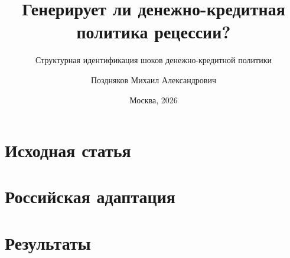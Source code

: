\documentclass[aspectratio=169]{beamer}
\title[ДКП и рецессии]{Генерирует ли денежно-кредитная политика рецессии?}
\subtitle{Структурная идентификация шоков денежно-кредитной политики}
\author[Поздняков М. А.]{Поздняков Михаил Александрович}
\institute{Факультет экономических наук\\НИУ ВШЭ}
\date{Москва, 2026}
\begin{document}


\section{Исходная статья}







\section{Российская адаптация}





\section{Результаты}










\end{document}
